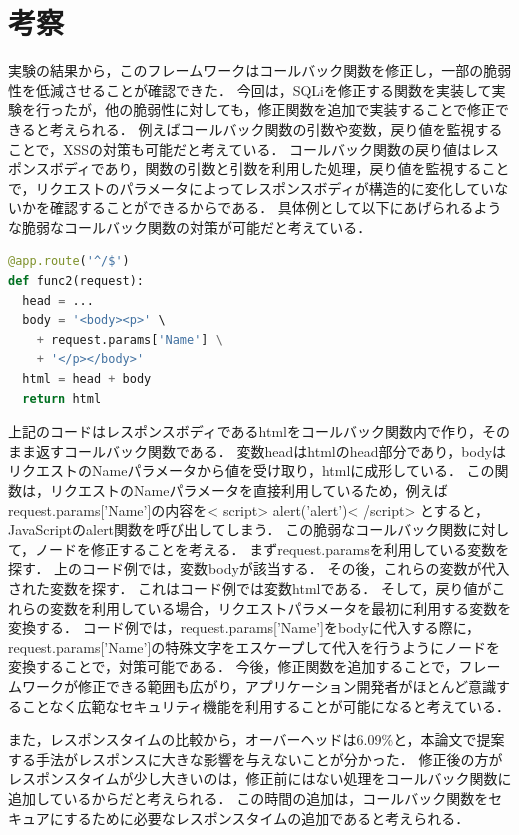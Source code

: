 \documentclass[submit]{ipsj}
\begin{document}
\section{考察}
実験の結果から，このフレームワークはコールバック関数を修正し，一部の脆弱性を低減させることが確認できた．
今回は，SQLiを修正する関数を実装して実験を行ったが，他の脆弱性に対しても，修正関数を追加で実装することで修正できると考えられる．
例えばコールバック関数の引数や変数，戻り値を監視することで，XSSの対策も可能だと考えている．
コールバック関数の戻り値はレスポンスボディであり，関数の引数と引数を利用した処理，戻り値を監視することで，リクエストのパラメータによってレスポンスボディが構造的に変化していないかを確認することができるからである．
具体例として以下にあげられるような脆弱なコールバック関数の対策が可能だと考えている．
\begin{lstlisting}[language=python]
@app.route('^/$')
def func2(request):
  head = ...
  body = '<body><p>' \
    + request.params['Name'] \
    + '</p></body>'
  html = head + body
  return html
\end{lstlisting}
上記のコードはレスポンスボディであるhtmlをコールバック関数内で作り，そのまま返すコールバック関数である．
変数headはhtmlのhead部分であり，bodyはリクエストのNameパラメータから値を受け取り，htmlに成形している．
この関数は，リクエストのNameパラメータを直接利用しているため，例えばrequest.params['Name']の内容を\textless
script\textgreater
alert('alert')\textless
/script\textgreater
とすると，JavaScriptのalert関数を呼び出してしまう．
この脆弱なコールバック関数に対して，ノードを修正することを考える．
まずrequest.paramsを利用している変数を探す．
上のコード例では，変数bodyが該当する．
その後，これらの変数が代入された変数を探す．
これはコード例では変数htmlである．
そして，戻り値がこれらの変数を利用している場合，リクエストパラメータを最初に利用する変数を変換する．
コード例では，request.params['Name']をbodyに代入する際に，request.params['Name']の特殊文字をエスケープして代入を行うようにノードを変換することで，対策可能である．
今後，修正関数を追加することで，フレームワークが修正できる範囲も広がり，アプリケーション開発者がほとんど意識することなく広範なセキュリティ機能を利用することが可能になると考えている．

また，レスポンスタイムの比較から，オーバーヘッドは6.09\%と，本論文で提案する手法がレスポンスに大きな影響を与えないことが分かった．
修正後の方がレスポンスタイムが少し大きいのは，修正前にはない処理をコールバック関数に追加しているからだと考えられる．
この時間の追加は，コールバック関数をセキュアにするために必要なレスポンスタイムの追加であると考えられる．
\end{document}
